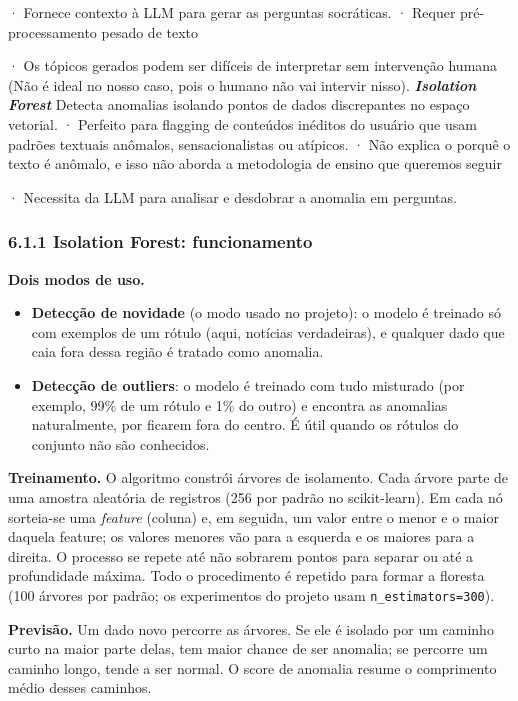 \documentclass[
  brazilian,
  11pt,
]{article}
\providecommand{\tightlist}{%
  \setlength{\itemsep}{0pt}\setlength{\parskip}{0pt}}
\begin{document}
· Fornece contexto à LLM para gerar as perguntas socráticas. \textbar{} · Requer pré-processamento pesado de texto

· Os tópicos gerados podem ser difíceis de interpretar sem intervenção humana (Não é ideal no nosso caso, pois o humano não vai intervir nisso). \textbar{}
\textbar{} \textbf{\emph{Isolation Forest}} \textbar{} Detecta anomalias isolando pontos de dados discrepantes no espaço vetorial. \textbar{} · Perfeito para flagging de conteúdos inéditos do usuário que usam padrões textuais anômalos, sensacionalistas ou atípicos. \textbar{} · Não explica o porquê o texto é anômalo, e isso não aborda a metodologia de ensino que queremos seguir

· Necessita da LLM para analisar e desdobrar a anomalia em perguntas. \textbar{}

\subsubsection{6.1.1 Isolation Forest: funcionamento}\label{isolation-forest-funcionamento}

\textbf{Dois modos de uso.}

\begin{itemize}
\tightlist
\item
  \textbf{Detecção de novidade} (o modo usado no projeto): o modelo é treinado só com exemplos de um rótulo (aqui, notícias verdadeiras), e qualquer dado que caia fora dessa região é tratado como anomalia.
\item
  \textbf{Detecção de outliers}: o modelo é treinado com tudo misturado (por exemplo, 99\% de um rótulo e 1\% do outro) e encontra as anomalias naturalmente, por ficarem fora do centro. É útil quando os rótulos do conjunto não são conhecidos.
\end{itemize}

\textbf{Treinamento.} O algoritmo constrói árvores de isolamento. Cada árvore parte de uma amostra aleatória de registros (256 por padrão no scikit-learn). Em cada nó sorteia-se uma \emph{feature} (coluna) e, em seguida, um valor entre o menor e o maior daquela feature; os valores menores vão para a esquerda e os maiores para a direita. O processo se repete até não sobrarem pontos para separar ou até a profundidade máxima. Todo o procedimento é repetido para formar a floresta (100 árvores por padrão; os experimentos do projeto usam \texttt{n\_estimators=300}).

\textbf{Previsão.} Um dado novo percorre as árvores. Se ele é isolado por um caminho curto na maior parte delas, tem maior chance de ser anomalia; se percorre um caminho longo, tende a ser normal. O score de anomalia resume o comprimento médio desses caminhos.
\end{document}
